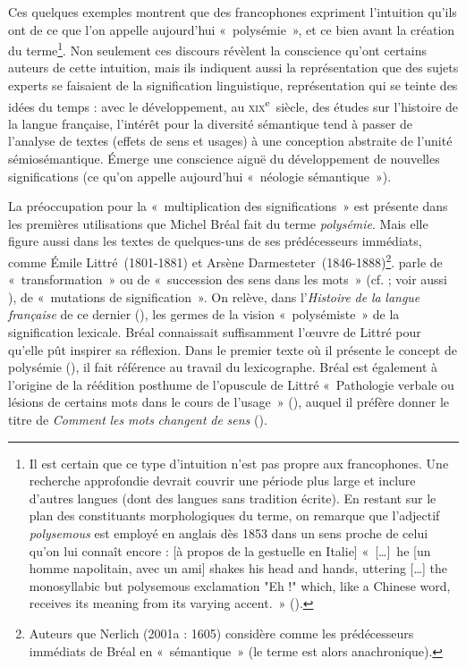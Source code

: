 \documentclass[output=paper]{langsci/langscibook}
\begin{document}
Ces quelques exemples montrent que des francophones expriment l’intuition qu’ils ont de ce que l’on appelle aujourd’hui «~polysémie~», et ce bien avant la création du terme\footnote{ \textrm{Il est certain que ce type d’intuition n’est pas propre aux francophones. Une recherche approfondie devrait couvrir une période plus large et inclure d’autres langues (dont des langues sans tradition écrite). En restant sur le plan des constituants morphologiques du terme, on remarque que l’adjectif} \textrm{\textit{polysemous}} \textrm{est employé en anglais dès 1853 dans un sens proche de celui qu’on lui connaît encore : [à propos de la gestuelle en Italie] «~[…]~he [un homme napolitain, avec un ami] shakes his head and hands, uttering […] the monosyllabic but polysemous exclamation "Eh !" which, like a Chinese word, receives its meaning from its varying accent.~» (\citealt[534]{wiseman_essays_1853}).}}. Non seulement ces discours révèlent la conscience qu’ont certains auteurs de cette intuition, mais ils indiquent aussi la représentation que des sujets experts se faisaient de la signification linguistique, représentation qui se teinte des idées du temps : avec le développement, au \textsc{xix}\textsuperscript{e}~siècle, des études sur l’histoire de la langue française, l’intérêt pour la diversité sémantique tend à passer de l’analyse de textes (effets de sens et usages) à une conception abstraite de l’unité sémiosémantique. Émerge une conscience aiguë du développement de nouvelles significations (ce qu’on appelle aujourd’hui «~néologie sémantique~»).

La préoccupation pour la «~multiplication des significations~» est présente dans les premières utilisations que Michel Bréal fait du terme \textit{polysémie}. Mais elle figure aussi dans les textes de quelques-uns de ses prédécesseurs immédiats, comme Émile Littré~(1801-1881) et Arsène Darmesteter~(1846-1888)\footnote{ \textrm{Auteurs que Nerlich (2001a : 1605) considère comme les prédécesseurs immédiats de Bréal en «~sémantique~» (le terme est alors anachronique).}}. \citet[11-12]{darmesteter_traite_1874} parle de «~transformation~» ou de «~succession des sens dans les mots~» (cf. \citealt{darmesteter_sur_1876}; voir aussi \citealt{bailly_transformation_1874}), \citet[1]{littre_etudes_1880} de «~mutations de signification~». On relève, dans l’\textit{Histoire} \textit{de} \textit{la} \textit{langue} \textit{française} de ce dernier (\citealt{littre_histoire_1863}), les germes de la vision «~polysémiste~» de la signification lexicale. Bréal connaissait suffisamment l’œuvre de Littré pour qu’elle pût inspirer sa réflexion. Dans le premier texte où il présente le concept de polysémie (\citealt{breal_lhistoire_1887}), il fait référence au travail du lexicographe. Bréal est également à l’origine de la réédition posthume de l’opuscule de Littré «~Pathologie verbale ou lésions de certains mots dans le cours de l’usage~» (\citealt{littre_etudes_1880}), auquel il préfère donner le titre de \textit{Comment} \textit{les} \textit{mots} \textit{changent} \textit{de} \textit{sens} (\citealt{littre_comment_1888}).
\end{document}
